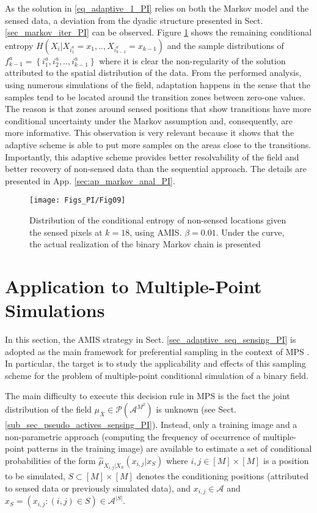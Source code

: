 As the solution in \eqref{eq_adaptive_1_PI} relies on both the Markov model and the sensed data, a deviation from the dyadic structure presented in Sect. \ref{sec_markov_iter_PI} can be observed. Figure \ref{fig:re_adapMarkov_BreakDyadic_1_PI} shows the remaining conditional entropy $H(X_i|X_{i^a_1}=x_1,..,X_{i^a_{k-1}}=x_{k-1})$ and the sample distributions of  ${f}^a_{k-1}=\left\{i^a_1, i^a_2,..,i^a_{k-1} \right\}$ where it is clear the non-regularity of the solution attributed to the spatial distribution of the data. From the performed analysis, using numerous simulations of the field, adaptation happens in the sense that the samples tend to be located around the transition zones between zero-one values. The reason is that zones around sensed positions that show transitions have more conditional uncertainty under the Markov assumption and, consequently, are more informative.
This observation is very relevant because it shows that the adaptive scheme is able to put more samples on the areas
close to the transitions. Importantly, this adaptive scheme provides better resolvability of the field and better recovery of non-sensed data than the sequential approach. The details are presented in App. \ref{sec:ap_markov_anal_PI}.
\begin{figure}[!ht]
    \centering
    \texttt{[image: Figs\_PI/Fig09]}
	\caption[Distribution of the conditional entropy of non-sensed locations.]{ \label{fig:re_adapMarkov_BreakDyadic_1_PI}
	 Distribution of the conditional entropy of non-sensed locations given the sensed pixels at $k=18$, using AMIS. $\beta = 0.01$. {Under the curve, the actual realization of the binary Markov chain is presented}}
\end{figure}

\section{Application to Multiple-Point Simulations}
\label{sec_appl_mps_PI}

In this section, the AMIS strategy in Sect. \ref{sec_adaptive_seq_sensing_PI} is adopted as the main framework for preferential sampling  in the context of MPS \citep{Mariethoz_2014_a}. In particular,  the target is to study the applicability and effects of this sampling scheme for the problem of multiple-point conditional simulation of a binary field.

The main difficulty to execute this decision rule in MPS is the fact the joint distribution of the field  $\mu_{\bar{X}}\in \mathcal{P}(\mathcal{A}^{M^2})$ is unknown (see Sect. \ref{sub_sec_pseudo_actives_sensing_PI}). Instead, only a training image and a non-parametric approach (computing the frequency of occurrence of multiple-point patterns in the training image) are available to estimate a set of conditional probabilities of the form $\hat{\mu}_{X_{i,j}| X_S}(x_{i,j}|x_S )$  where ${i,j}\in [M]\times [M]$ is a position to be simulated,  $S\subset [M]\times [M]$ denotes the conditioning positions (attributed to sensed data or previously simulated data),  and $x_{i,j}\in \mathcal{A}$ and $ x_S =(x_{i,j}:(i,j)\in S)\in \mathcal{A}^{\left|S \right|}$.

